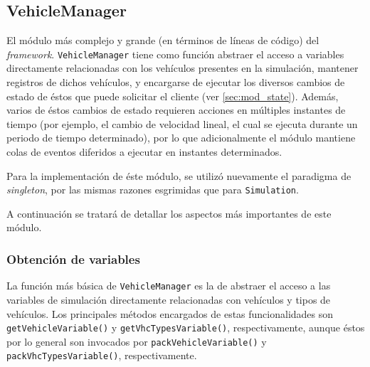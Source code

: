 \subsection{VehicleManager}\label{sec:vehiclemanager}

El módulo más complejo y grande (en términos de líneas de código) del \emph{framework}. \texttt{VehicleManager} tiene como función abstraer el acceso a variables directamente relacionadas con los vehículos presentes en la simulación, mantener registros de dichos vehículos, y encargarse de ejecutar los diversos cambios de estado de éstos que puede solicitar el cliente (ver \ref{sec:mod_state}). Además, varios de éstos cambios de estado requieren acciones en múltiples instantes de tiempo (por ejemplo, el cambio de velocidad lineal, el cual se ejecuta durante un periodo de tiempo determinado), por lo que adicionalmente el módulo mantiene colas de eventos diferidos a ejecutar en instantes determinados.

Para la implementación de éste módulo, se utilizó nuevamente el paradigma de \emph{singleton}, por las mismas razones esgrimidas que para \texttt{Simulation}.

A continuación se tratará de detallar los aspectos más importantes de este módulo.

\subsubsection{Obtención de variables}

La función más básica de \texttt{VehicleManager} es la de abstraer el acceso a las variables de simulación directamente relacionadas con vehículos y tipos de vehículos. Los principales métodos encargados de estas funcionalidades son \texttt{getVehicleVariable()} y \texttt{getVhcTypesVariable()}, respectivamente, aunque éstos por lo general son invocados por \texttt{packVehicleVariable()} y \texttt{packVhcTypesVariable()}, respectivamente.